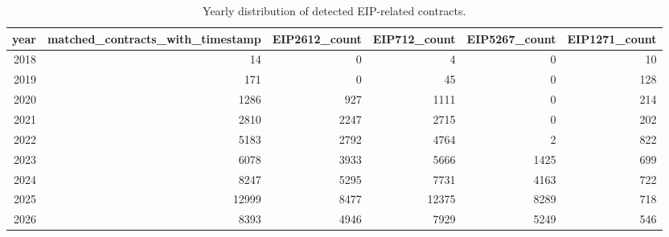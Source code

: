 \begin{table}
\caption{Yearly distribution of detected EIP-related contracts.}
\label{tab:eip-adoption-yearly}
\begin{tabular}{rrrrrr}
\toprule
year & matched_contracts_with_timestamp & EIP2612_count & EIP712_count & EIP5267_count & EIP1271_count \\
\midrule
2018 & 14 & 0 & 4 & 0 & 10 \\
2019 & 171 & 0 & 45 & 0 & 128 \\
2020 & 1286 & 927 & 1111 & 0 & 214 \\
2021 & 2810 & 2247 & 2715 & 0 & 202 \\
2022 & 5183 & 2792 & 4764 & 2 & 822 \\
2023 & 6078 & 3933 & 5666 & 1425 & 699 \\
2024 & 8247 & 5295 & 7731 & 4163 & 722 \\
2025 & 12999 & 8477 & 12375 & 8289 & 718 \\
2026 & 8393 & 4946 & 7929 & 5249 & 546 \\
\bottomrule
\end{tabular}
\end{table}
